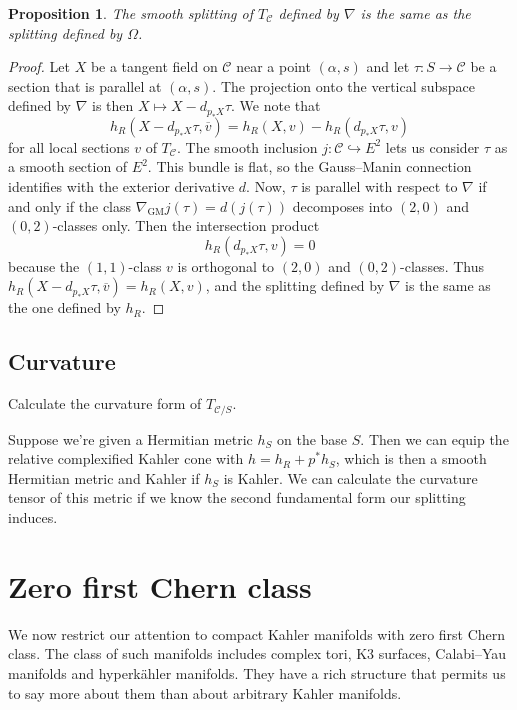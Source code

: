 \documentclass[11pt,a4paper]{amsart}
\newtheorem{prop}[theo]{Proposition}
\theoremstyle{definition}
\theoremstyle{remark}
\def\ov#1{\overline{#1}}
\def\conn{\nabla}
\def\conngm{\nabla_{\mathrm{GM}}}
\def\ckf{\alpha}
\def\kcForm{\Omega}
\def\kcHerm{h_R}
\def\ttw{v}
\def\KC{C}
\def\RKC{\mathcal{\KC}}
\begin{document}
\begin{prop}
The smooth splitting of $T_{\RKC}$ defined by $\conn$ is the same
as the splitting defined by $\kcForm$.
\end{prop}


\begin{proof}
Let $X$ be a tangent field on $\RKC$ near a point
$(\ckf,s)$ and let $\tau : S \to \RKC$ be a section that is
parallel at $(\ckf,s)$. The projection onto the vertical subspace
defined by $\conn$ is then $X \mapsto X - d_{p_*X} \tau$. We note that
$$
\kcHerm(X - d_{p_*X} \tau, \ov{\ttw})
= \kcHerm(X, \ttw) - \kcHerm(d_{p_*X} \tau, \ttw)
$$
for all local sections $v$ of $T_{\RKC}$. The smooth inclusion
$j : \RKC \hookrightarrow E^2$ lets us consider $\tau$ as a smooth
section of $E^2$. This bundle is flat, so the Gauss--Manin connection
identifies with the exterior derivative $d$. Now, $\tau$ is parallel
with respect to $\conn$ if and only if the class $\conngm j(\tau) = d
(j(\tau))$ decomposes into $(2,0)$ and $(0,2)$-classes only. Then the
intersection product
$$
\kcHerm(d_{p_*X} \tau, \ttw) = 0
$$
because the $(1,1)$-class $\ttw$ is orthogonal to $(2,0)$ and
$(0,2)$-classes. Thus $\kcHerm(X - d_{p_*X} \tau, \ov{\ttw})
= \kcHerm(X, \ttw)$, and the splitting defined by $\conn$ is the same
as the one defined by $\kcHerm$.
\end{proof}


\subsection*{Curvature}


Calculate the curvature form of $T_{\RKC/S}$.


Suppose we're given a Hermitian metric $h_S$ on the base $S$. Then we
can equip the relative complexified Kahler cone with $h = \kcHerm + 
p^*h_S$, which is then a smooth Hermitian metric and Kahler if $h_S$ is
Kahler. We can calculate the curvature tensor of this metric if we know
the second fundamental form our splitting induces.




\section{Zero first Chern class}


We now restrict our attention to compact Kahler manifolds with zero
first Chern class. The class of such manifolds includes complex tori, K3
surfaces, Calabi--Yau manifolds and hyperk\"{a}hler manifolds. They have
a rich structure that permits us to say more about them than about
arbitrary Kahler manifolds.
\end{document}
